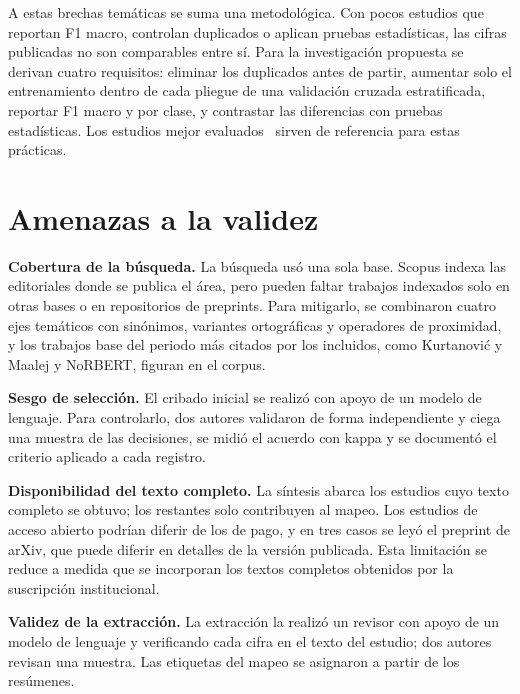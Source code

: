 \documentclass[conference]{IEEEtran}
\begin{document}
A estas brechas temáticas se suma una metodológica. Con pocos estudios que reportan F1 macro, controlan duplicados o aplican pruebas estadísticas, las cifras publicadas no son comparables entre sí. Para la investigación propuesta se derivan cuatro requisitos: eliminar los duplicados antes de partir, aumentar solo el entrenamiento dentro de cada pliegue de una validación cruzada estratificada, reportar F1 macro y por clase, y contrastar las diferencias con pruebas estadísticas. Los estudios mejor evaluados~\cite{Hey2020-NoRBERT,Binkhonain2023-Machine,Binkhonain2025-Prompts,Alhoshan2023-ZeroShot,NguyenVan2026-Evaluating,Shafikuzzaman2025-Effectiveness,Said2026-Intelligent} sirven de referencia para estas prácticas.

\section{Amenazas a la validez}\label{sec:amenazas}
\textbf{Cobertura de la búsqueda.} La búsqueda usó una sola base. Scopus indexa las editoriales donde se publica el área, pero pueden faltar trabajos indexados solo en otras bases o en repositorios de preprints. Para mitigarlo, se combinaron cuatro ejes temáticos con sinónimos, variantes ortográficas y operadores de proximidad, y los trabajos base del periodo más citados por los incluidos, como Kurtanović y Maalej y NoRBERT, figuran en el corpus.

\textbf{Sesgo de selección.} El cribado inicial se realizó con apoyo de un modelo de lenguaje. Para controlarlo, dos autores validaron de forma independiente y ciega una muestra de las decisiones, se midió el acuerdo con kappa y se documentó el criterio aplicado a cada registro.

\textbf{Disponibilidad del texto completo.} La síntesis abarca los \nSintesis{} estudios cuyo texto completo se obtuvo; los \nSinAcceso{} restantes solo contribuyen al mapeo. Los estudios de acceso abierto podrían diferir de los de pago, y en tres casos se leyó el preprint de arXiv, que puede diferir en detalles de la versión publicada. Esta limitación se reduce a medida que se incorporan los textos completos obtenidos por la suscripción institucional.

\textbf{Validez de la extracción.} La extracción la realizó un revisor con apoyo de un modelo de lenguaje y verificando cada cifra en el texto del estudio; dos autores revisan una muestra. Las etiquetas del mapeo se asignaron a partir de los resúmenes.
\end{document}
